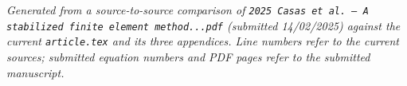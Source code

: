 \documentclass[11pt]{article}
\begin{document}
\vfill
\begin{center}\footnotesize\itshape
Generated from a source-to-source comparison of \texttt{2025 Casas et al. – A stabilized finite element method...pdf} (submitted 14/02/2025)
against the current \texttt{article.tex} and its three appendices.
Line numbers refer to the current sources; submitted equation numbers and PDF pages refer to the
submitted manuscript.
\end{center}
\end{document}
